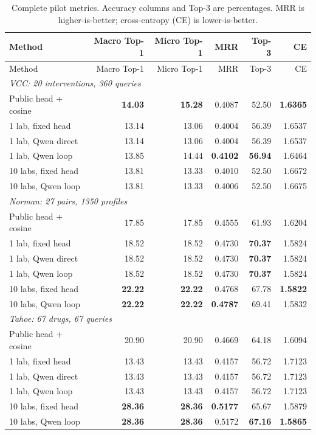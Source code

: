 \begin{longtable}{lrrrrr}
\caption{Complete pilot metrics. Accuracy columns and Top-3 are percentages. MRR is higher-is-better; cross-entropy (CE) is lower-is-better.}\\
\toprule Method & Macro Top-1 & Micro Top-1 & MRR & Top-3 & CE \\ \midrule
\endfirsthead
\toprule Method & Macro Top-1 & Micro Top-1 & MRR & Top-3 & CE \\ \midrule
\endhead
\multicolumn{6}{l}{\textit{VCC: 20 interventions, 360 queries}} \\
Public head + cosine & \textbf{14.03} & \textbf{15.28} & 0.4087 & 52.50 & \textbf{1.6365} \\
1 lab, fixed head & 13.14 & 13.06 & 0.4004 & 56.39 & 1.6537 \\
1 lab, Qwen direct & 13.14 & 13.06 & 0.4004 & 56.39 & 1.6537 \\
1 lab, Qwen loop & 13.85 & 14.44 & \textbf{0.4102} & \textbf{56.94} & 1.6464 \\
10 labs, fixed head & 13.81 & 13.33 & 0.4010 & 52.50 & 1.6672 \\
10 labs, Qwen loop & 13.81 & 13.33 & 0.4006 & 52.50 & 1.6675 \\
\midrule
\multicolumn{6}{l}{\textit{Norman: 27 pairs, 1350 profiles}} \\
Public head + cosine & 17.85 & 17.85 & 0.4555 & 61.93 & 1.6204 \\
1 lab, fixed head & 18.52 & 18.52 & 0.4730 & \textbf{70.37} & 1.5824 \\
1 lab, Qwen direct & 18.52 & 18.52 & 0.4730 & \textbf{70.37} & 1.5824 \\
1 lab, Qwen loop & 18.52 & 18.52 & 0.4730 & \textbf{70.37} & 1.5824 \\
10 labs, fixed head & \textbf{22.22} & \textbf{22.22} & 0.4768 & 67.78 & \textbf{1.5822} \\
10 labs, Qwen loop & \textbf{22.22} & \textbf{22.22} & \textbf{0.4787} & 69.41 & 1.5832 \\
\midrule
\multicolumn{6}{l}{\textit{Tahoe: 67 drugs, 67 queries}} \\
Public head + cosine & 20.90 & 20.90 & 0.4669 & 64.18 & 1.6094 \\
1 lab, fixed head & 13.43 & 13.43 & 0.4157 & 56.72 & 1.7123 \\
1 lab, Qwen direct & 13.43 & 13.43 & 0.4157 & 56.72 & 1.7123 \\
1 lab, Qwen loop & 13.43 & 13.43 & 0.4157 & 56.72 & 1.7123 \\
10 labs, fixed head & \textbf{28.36} & \textbf{28.36} & \textbf{0.5177} & 65.67 & 1.5879 \\
10 labs, Qwen loop & \textbf{28.36} & \textbf{28.36} & 0.5172 & \textbf{67.16} & \textbf{1.5865} \\
\midrule
\end{longtable}
